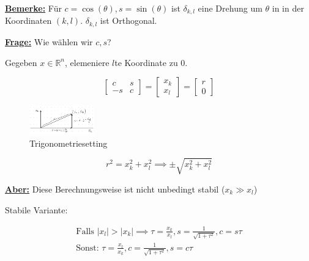 \documentclass{book}
\def\R{\mathbb{R}}
\begin{document}
            \underline{\textbf{Bemerke:}} Für $c=\cos(\theta),s=\sin(\theta)$ ist $\delta_{k,l}$ eine Drehung um $\theta$ in 
            in der Koordinaten $(k,l)$. $\delta_{k,l}$ ist Orthogonal.

            \underline{\textbf{Frage:}} Wie wählen wir $c,s$? 
            
            Gegeben $x\in\R^n$, elemeniere $l$te Koordinate zu $0$.

            \[\begin{bmatrix}
                c & s\\ -s & c
            \end{bmatrix}=\begin{bmatrix}
                x_k\\ x_l
            \end{bmatrix}=\begin{bmatrix}
                r\\0
            \end{bmatrix}\]

            \begin{figure}[H]
                \centering
                \includegraphics[width=0.25\textwidth]{Bild008}
                \caption{Trigonometriesetting}
            \end{figure}

            \begin{equation*}
                r^2=x_k^2+x_l^2
                \implies \pm \sqrt{x_k^2+x_l^2}
            \end{equation*}

            \underline{\textbf{Aber:}} Diese Berechnungsweise ist nicht unbedingt stabil ($x_k\gg x_l$)

            Stabile Variante:


            \begin{equation}\label{e2.3}
                \begin{array}{c}
                    \text{Falls }\left\vert x_l \right\vert>\left\vert x_k \right\vert\implies \tau =\frac{x_k}{x_l},s=\frac{1}{\sqrt{1+\tau^2}},c=s\tau\\
                    \text{Sonst: }\tau=\frac{x_l}{x_k},c=\frac{1}{\sqrt{1+\tau^2}},s=c\tau
                \end{array}
            \end{equation}
        
\end{document}
